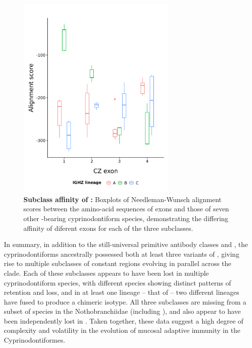 \begin{figure}
	\centering
	\includegraphics[width=0.7\textwidth]{_Figures/png/ppl-cz-aln-aa.png}
	\caption[Subclass affinity of  ]{\textbf{Subclass affinity of  :} 
	Boxplots of Needleman-Wunsch alignment scores between the amino-acid sequences of  \cz{} exons and those of seven other -bearing cyprinodontiform species, demonstrating the differing affinity of diferent  exons for each of the three  subclasses.}
	\label{fig:ppl-cz-aln}
\end{figure}
	
In summary, in addition to the still-universal primitive antibody classes  and , the cyprinodontiforms ancestrally possessed both at least three variants of , giving rise to multiple subclasses of  constant regions evolving in parallel across the clade. Each of these subclasses appears to have been lost in multiple cyprinodontiform species, with different species showing distinct patterns of retention and loss, and in at least one lineage -- that of  -- two different  lineages have fused to produce a chimeric isotype. All three subclasses are missing from a subset of species in the Nothobranchiidae (including \nfu), and also appear to have been independently lost in . Taken together, these data suggest a high degree of complexity and volatility in the evolution of mucosal adaptive immunity in the Cyprinodontiformes.

